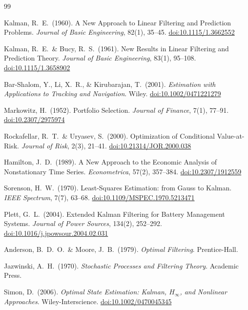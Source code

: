 \documentclass[12pt,openany]{book}
\numberwithin{equation}{chapter}
\theoremstyle{plain}
\theoremstyle{definition}
\theoremstyle{remark}
\begin{document}
\begin{thebibliography}{99}

Kalman, R.\ E.\ (1960).
A New Approach to Linear Filtering and Prediction Problems.
\textit{Journal of Basic Engineering}, 82(1), 35--45.
\href{https://doi.org/10.1115/1.3662552}{doi:10.1115/1.3662552}

Kalman, R.\ E.\ \& Bucy, R.\ S.\ (1961).
New Results in Linear Filtering and Prediction Theory.
\textit{Journal of Basic Engineering}, 83(1), 95--108.
\href{https://doi.org/10.1115/1.3658902}{doi:10.1115/1.3658902}

Bar-Shalom, Y., Li, X.\ R., \& Kirubarajan, T.\ (2001).
\textit{Estimation with Applications to Tracking and Navigation}.
Wiley.
\href{https://doi.org/10.1002/0471221279}{doi:10.1002/0471221279}

Markowitz, H.\ (1952).
Portfolio Selection.
\textit{Journal of Finance}, 7(1), 77--91.
\href{https://doi.org/10.2307/2975974}{doi:10.2307/2975974}

Rockafellar, R.\ T.\ \& Uryasev, S.\ (2000).
Optimization of Conditional Value-at-Risk.
\textit{Journal of Risk}, 2(3), 21--41.
\href{https://doi.org/10.21314/JOR.2000.038}{doi:10.21314/JOR.2000.038}

Hamilton, J.\ D.\ (1989).
A New Approach to the Economic Analysis of Nonstationary Time Series.
\textit{Econometrica}, 57(2), 357--384.
\href{https://doi.org/10.2307/1912559}{doi:10.2307/1912559}

Sorenson, H.\ W.\ (1970).
Least-Squares Estimation: from Gauss to Kalman.
\textit{IEEE Spectrum}, 7(7), 63--68.
\href{https://doi.org/10.1109/MSPEC.1970.5213471}{doi:10.1109/MSPEC.1970.5213471}

Plett, G.\ L.\ (2004).
Extended Kalman Filtering for Battery Management Systems.
\textit{Journal of Power Sources}, 134(2), 252--292.
\href{https://doi.org/10.1016/j.jpowsour.2004.02.031}{doi:10.1016/j.jpowsour.2004.02.031}

Anderson, B.\ D.\ O.\ \& Moore, J.\ B.\ (1979).
\textit{Optimal Filtering}.
Prentice-Hall.

Jazwinski, A.\ H.\ (1970).
\textit{Stochastic Processes and Filtering Theory}.
Academic Press.

Simon, D.\ (2006).
\textit{Optimal State Estimation: Kalman, $H_\infty$, and Nonlinear
Approaches}.
Wiley-Interscience.
\href{https://doi.org/10.1002/0470045345}{doi:10.1002/0470045345}


\end{thebibliography}
\end{document}
